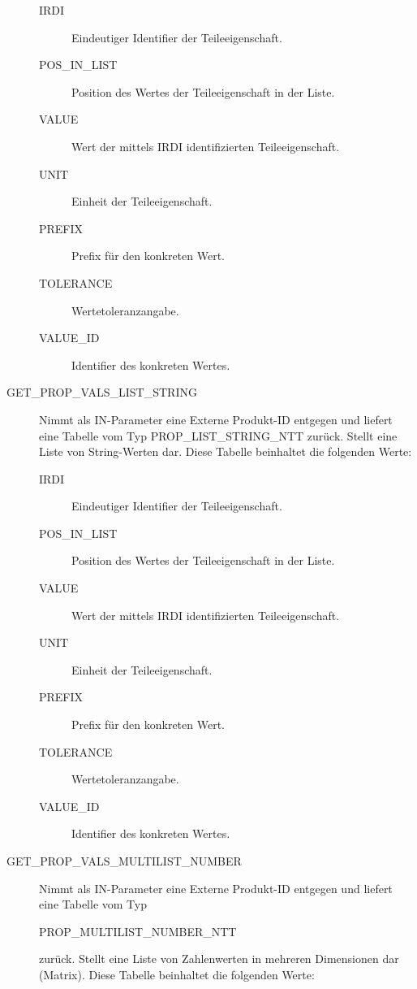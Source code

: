 \begin{description}
  \begin{description}
  \item[IRDI] Eindeutiger Identifier der Teileeigenschaft.
  \item[POS\_IN\_LIST] Position des Wertes der Teileeigenschaft in der Liste.
  \item[VALUE] Wert der mittels IRDI identifizierten Teileeigenschaft.
  \item[UNIT] Einheit der Teileeigenschaft.
  \item[PREFIX] Prefix für den konkreten Wert.
  \item[TOLERANCE] Wertetoleranzangabe.
  \item[VALUE\_ID] Identifier des konkreten Wertes.
  \end{description}
  
\item[GET\_PROP\_VALS\_LIST\_STRING] Nimmt als IN-Parameter eine Externe Produkt-ID entgegen und liefert eine Tabelle vom Typ PROP\_LIST\_STRING\_NTT zurück. Stellt eine Liste von String-Werten dar. 
Diese Tabelle beinhaltet die folgenden Werte: 

  \begin{description}
  \item[IRDI] Eindeutiger Identifier der Teileeigenschaft.
  \item[POS\_IN\_LIST] Position des Wertes der Teileeigenschaft in der Liste.
  \item[VALUE] Wert der mittels IRDI identifizierten Teileeigenschaft.
  \item[UNIT] Einheit der Teileeigenschaft.
  \item[PREFIX] Prefix für den konkreten Wert.
  \item[TOLERANCE] Wertetoleranzangabe.
  \item[VALUE\_ID] Identifier des konkreten Wertes.
  \end{description}
\item[GET\_PROP\_VALS\_MULTILIST\_NUMBER] Nimmt als IN-Parameter eine Externe Produkt-ID entgegen und liefert eine Tabelle vom Typ 

PROP\_MULTILIST\_NUMBER\_NTT 

zurück. Stellt eine Liste von Zahlenwerten in mehreren Dimensionen dar (Matrix). 
Diese Tabelle beinhaltet die folgenden Werte: 


\end{description}
